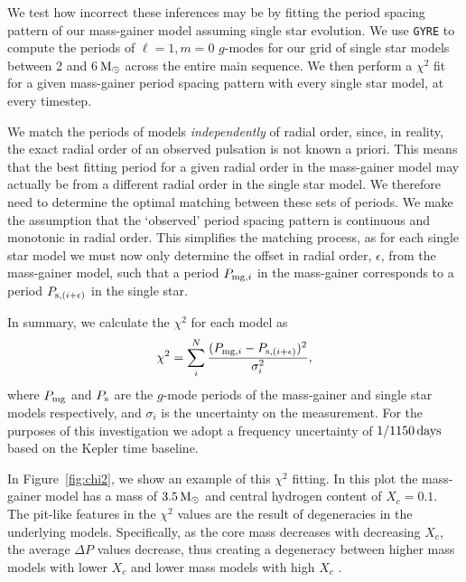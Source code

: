 \documentclass[desactivate]{aa}
\begin{document}
We test how incorrect these inferences may be by fitting the period spacing pattern of our mass-gainer model assuming single star evolution. We use \texttt{GYRE} to compute the periods of $\ell = 1, m = 0$ $g$-modes for our grid of single star models between 2 and 6$\,{\rm M_\odot}$ across the entire main sequence. We then perform a $\chi^2$ fit for a given mass-gainer period spacing pattern with every single star model, at every timestep.

We match the periods of models \textit{independently} of radial order, since, in reality, the exact radial order of an observed pulsation is not known a priori. This means that the best fitting period for a given radial order in the mass-gainer model may actually be from a different radial order in the single star model. We therefore need to determine the optimal matching between these sets of periods. We make the assumption that the `observed' period spacing pattern is continuous and monotonic in radial order. This simplifies the matching process, as for each single star model we must now only determine the offset in radial order, $\epsilon$, from the mass-gainer model, such that a period $P_{{\rm mg}, i}$ in the mass-gainer corresponds to a period $P_{{\rm s}, (i + \epsilon)}$ in the single star.

In summary, we calculate the $\chi^2$ for each model as
\begin{equation}
    \chi^2 = \sum_{i}^{N} \frac{(P_{{\rm mg}, i} - P_{{\rm s}, (i + \epsilon)})^2}{\sigma_i^2},
\end{equation}
where $P_{\rm mg}$ and $P_{\rm s}$ are the $g$-mode periods of the mass-gainer and single star models respectively, and $\sigma_i$ is the uncertainty on the measurement. For the purposes of this investigation we adopt a frequency uncertainty of $1 / 1150 \, {\rm days}$ based on the Kepler time baseline.

In Figure~\ref{fig:chi2}, we show an example of this $\chi^2$ fitting. In this plot the mass-gainer model has a mass of $3.5 \,{\rm M_\odot}$ and central hydrogen content of $X_c = 0.1$. %
The pit-like features in the $\chi^2$ values are the result of degeneracies in the underlying models. Specifically, as the core mass decreases with decreasing $X_c$, the average $\Delta P$ values decrease, thus creating a degeneracy between higher mass models with lower $X_c$ and lower mass models with high $X_c$ \citep[e.g., ][]{Buysschaert+2018:2018A&A...616A.148B, Mombarg2019}.
\end{document}
